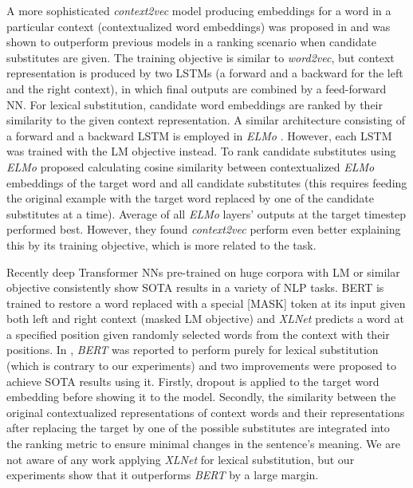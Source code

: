 \documentclass[11pt,a4paper]{article}
\begin{document}
A more sophisticated \textit{context2vec} model producing embeddings for a word in a particular context (contextualized word embeddings) was proposed in \cite{c2v} and was shown to outperform previous models in a ranking scenario when candidate substitutes are given. The training objective is similar to \textit{word2vec}, but context representation is produced by two LSTMs (a forward and a backward for the left and the right context), in which final outputs are combined by a feed-forward NN. For lexical substitution, candidate word embeddings are ranked by their similarity to the given context representation. A similar architecture consisting of a forward and a backward LSTM is employed in \textit{ELMo} \cite{peters-etal-2018-deep}. However, each LSTM was trained with the LM objective instead. To rank candidate substitutes using \textit{ELMo} \cite{soler-etal-2019-comparison} proposed calculating cosine similarity between contextualized \textit{ELMo} embeddings of the target word and all candidate substitutes (this requires feeding the original example with the target word replaced by one of the candidate substitutes at a time). Average of all \textit{ELMo} layers' outputs at the target timestep performed best. However, they found \textit{context2vec} perform even better explaining this by its training objective, which is more related to the task.

Recently deep Transformer NNs pre-trained on huge corpora with LM or similar objective consistently show SOTA results in a variety of NLP tasks. BERT \cite{devlin2018pretraining} is trained to restore a word replaced with a special [MASK] token at its input given both left and right context (masked LM objective) and \textit{XLNet} \cite{yang2019xlnet} predicts a word at a specified position given randomly selected words from the context with their positions. In \cite{zhou-etal-2019-bert}, \textit{BERT} was reported to perform purely for lexical substitution (which is contrary to our experiments) and two improvements were proposed to achieve SOTA results using it. Firstly, dropout is applied to the target word embedding before showing it to the model. Secondly, the similarity between the original contextualized representations of context words and their representations after replacing the target by one of the possible substitutes are integrated into the ranking metric to ensure minimal changes in the sentence's meaning. We are not aware of any work applying \textit{XLNet} for lexical substitution, but our experiments show that it outperforms \textit{BERT} by a large margin.
\end{document}
